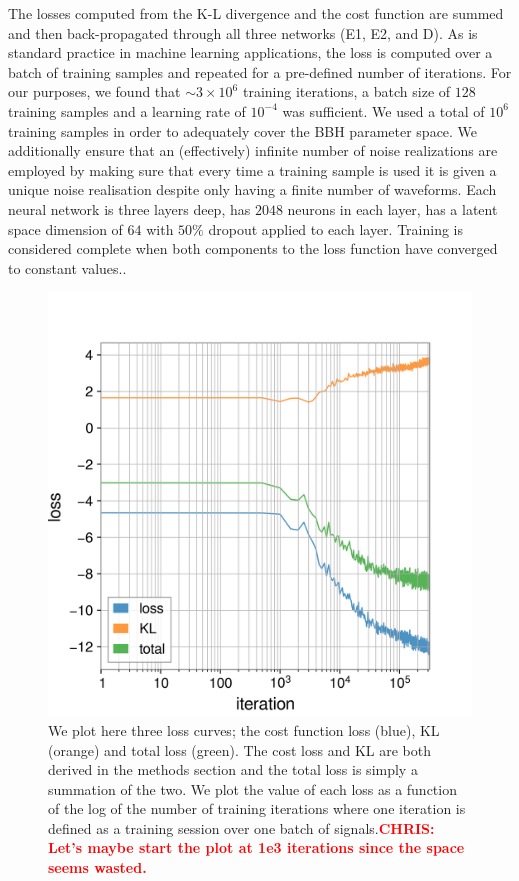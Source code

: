\documentclass[%
showpacs,
 amsmath,amssymb,
 aps,
 twocolumn,
 prl,
 reprint,
floatfix,
]{revtex4-1}
\newcommand{\chris}[1]{\textbf{\textcolor{red}{CHRIS: #1}}}
\begin{document}
%
%
The losses computed from the K-L divergence and the cost function are summed
and then back-propagated through all three networks (E1, E2, and D).  As is
standard practice in machine learning applications, the loss is computed over a
batch of training samples and repeated for a pre-defined number of iterations.
For our purposes, we found that $\sim3\times10^6$ training iterations, 
a batch size of $128$ training samples and a
learning rate of $10^{-4}$ was sufficient. We used a total of $10^6$ training
samples in order to adequately cover the \ac{BBH} parameter space.  We
additionally ensure that an (effectively) infinite number of noise realizations
are employed by making sure that every time a training sample is used it is
given a unique noise realisation despite only having a finite number of
waveforms. Each neural network is three layers deep, has $2048$ neurons in each
layer, has a latent space dimension of $64$ with $50\%$ dropout applied to each
layer. Training is considered complete when both components to the loss
function have converged to constant values..

%
%
\begin{figure}
    \includegraphics[width=\columnwidth]{images/inv_losses_log.png}
\caption{\label{fig:loss_log} We plot here three loss curves; the cost
function loss (blue), KL (orange) and total loss (green). The cost  loss and KL
are both derived in the methods section and the total loss is simply a
summation of the two. We plot the value of each loss as a function of the log
of the number of training iterations where one iteration is defined as a
training session over one batch of signals.\chris{Let's maybe start the plot at
1e3 iterations since the space seems wasted.}} 
\end{figure}
\end{document}
